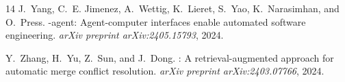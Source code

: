\documentclass[11pt,letterpaper]{article}
\begin{document}
\begin{thebibliography}{14}
J.~Yang, C.~E. Jimenez, A.~Wettig, K.~Lieret, S.~Yao, K.~Narasimhan, and O.~Press.
-agent: Agent-computer interfaces enable automated software engineering.
\newblock \emph{arXiv preprint arXiv:2405.15793}, 2024.

Y.~Zhang, H.~Yu, Z.~Sun, and J.~Dong.
: A retrieval-augmented approach for automatic merge conflict resolution.
\newblock \emph{arXiv preprint arXiv:2403.07766}, 2024.

\end{thebibliography}
\end{document}
